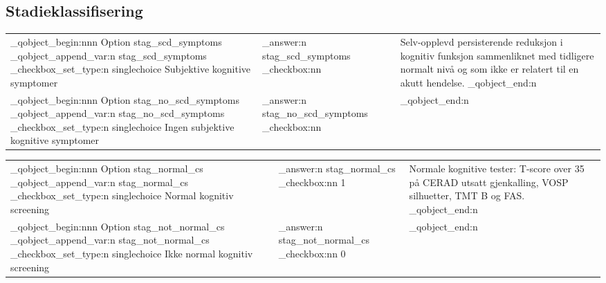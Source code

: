 \documentclass[pdf,  style=code128, globalid=OMRCRFv5.0.3, english, stamp, pagemark, oneside]{sdapsclassic}
\begin{document}
\begin{questionnaire}
 		\section{Stadieklassifisering}

 		\ExplSyntaxOn
 \newcommand{\diagrowrest}[4]{
 	\sdaps_qobject_begin:nnn {  } { Option } {stag_#4}
 	\sdaps_qobject_append_var:n {stag_#4}
 	\sdaps_checkbox_set_type:n {singlechoice}
 				#1 &
 	\sdaps_answer:n { stag_#4} \vbox{ \vspace{3pt} \sdaps_checkbox:nn {} {#2} } &
 	#3
 	\sdaps_qobject_end:n {}
 }
 \ExplSyntaxOff

 \begin{longtable}{|p{4cm} | p{0.5cm} | p{12cm}|}
   \hline
   \diagrowrest{Subjektive kognitive symptomer }{}{Selv-opplevd persisterende reduksjon i kognitiv funksjon sammenliknet med tidligere normalt nivå og som ikke er relatert til en akutt hendelse.}{scd_symptoms}
     \\

   \diagrowrest{Ingen subjektive kognitive symptomer}{}{}{no_scd_symptoms}

     \\
     \hline
 \end{longtable}

   \begin{longtable}{|p{4cm} | p{0.5cm} | p{12cm}|}
     \hline

     \diagrowrest{Normal kognitiv screening }{1}{Normale kognitive tester: T-score over 35 på CERAD utsatt gjenkalling, VOSP silhuetter, TMT B og FAS.}{normal_cs}
     \\
     \diagrowrest{Ikke normal kognitiv screening}{0}{}{not_normal_cs}
     \\
       \hline
   \end{longtable}

 \begin{longtable}{|p{4cm} | p{0.5cm} | p{12cm}|}


\end{longtable}
\end{questionnaire}
\end{document}
